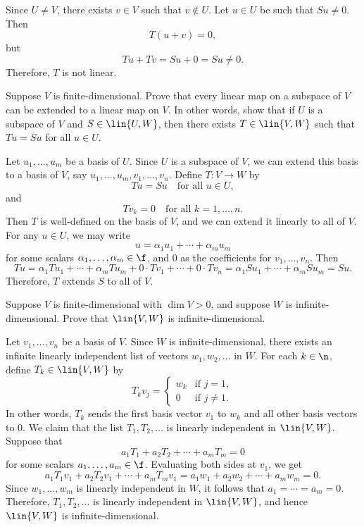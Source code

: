 \begin{sol}
    Since $U \neq V$, there exists $v \in V$ such that $v \notin U$. Let $u \in U$ be such that $Su \neq 0$. Then
    \[T(u + v) = 0,\]
    but
    \[Tu + Tv = Su + 0 = Su \neq 0.\]
    Therefore, $T$ is not linear.
\end{sol}

\begin{exercise}[3a13]
    Suppose $V$ is finite-dimensional. Prove that every linear map on a subspace of $V$ can be extended to a linear map on $V$. In other words, show that if $U$ is a subspace of $V$ and $S \in \lin{U, W}$, then there exists $T \in \lin{V, W}$ such that $Tu = Su$ for all $u \in U$.
\end{exercise}

\begin{sol}
    Let $u_1, \ldots, u_m$ be a basis of $U$. Since $U$ is a subspace of $V$, we can extend this basis to a basis of $V$, say $u_1, \ldots, u_m, v_1, \ldots, v_n$. Define $T: V \to W$ by
    \[Tu = Su \quad \text{for all } u \in U,\]
    and
    \[Tv_k = 0 \quad \text{for all } k = 1, \ldots, n.\]
    Then $T$ is well-defined on the basis of $V$, and we can extend it linearly to all of $V$. For any $u \in U$, we may write
    \[u = \alpha_1 u_1 + \cdots + \alpha_m u_m\]
    for some scalars $\alpha_1, \ldots, \alpha_m \in \f$, and 0 as the coefficients for $v_1, \ldots, v_n$. Then
    \[Tu = \alpha_1 Tu_1 + \cdots + \alpha_m Tu_m + 0 \cdot Tv_1 + \cdots + 0 \cdot Tv_n = \alpha_1 Su_1 + \cdots + \alpha_m Su_m = Su.\]
    Therefore, $T$ extends $S$ to all of $V$.
\end{sol}

\begin{exercise}[3a14]
    Suppose $V$ is finite-dimensional with $\dim V > 0$, and suppose $W$ is infinite-dimensional. Prove that $\lin{V, W}$ is infinite-dimensional.
\end{exercise}

\begin{sol}
    Let $v_1, \ldots, v_n$ be a basis of $V$. Since $W$ is infinite-dimensional, there exists an infinite linearly independent list of vectors $w_1, w_2, \ldots$ in $W$. For each $k \in \n$, define $T_k \in \lin{V, W}$ by
    \[T_k v_j =
    \begin{cases}
        w_k & \text{if } j = 1, \\
        0 & \text{if } j \neq 1.
    \end{cases}\]
    In other words, $T_k$ sends the first basis vector $v_1$ to $w_k$ and all other basis vectors to $0$. We claim that the list $T_1, T_2, \ldots$ is linearly independent in $\lin{V, W}$. Suppose that
    \[a_1 T_1 + a_2 T_2 + \cdots + a_m T_m = 0\]
    for some scalars $a_1, \ldots, a_m \in \f$. Evaluating both sides at $v_1$, we get
    \[a_1 T_1 v_1 + a_2 T_2 v_1 + \cdots + a_m T_m v_1 = a_1 w_1 + a_2 w_2 + \cdots + a_m w_m = 0.\]
    Since $w_1, \ldots, w_m$ is linearly independent in $W$, it follows that $a_1 = \cdots = a_m = 0$. Therefore, $T_1, T_2, \ldots$ is linearly independent in $\lin{V, W}$, and hence $\lin{V, W}$ is infinite-dimensional.
\end{sol}

